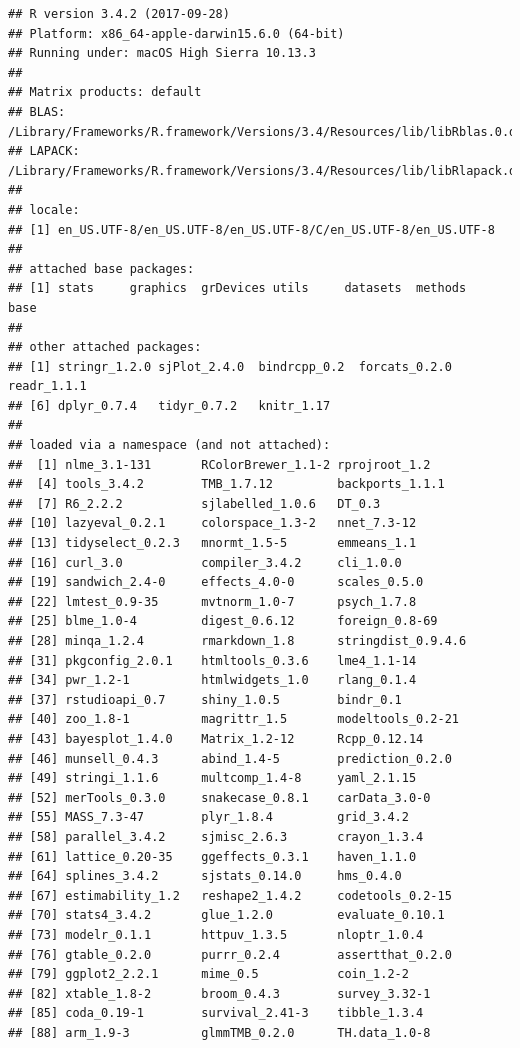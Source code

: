 \documentclass[]{article}
\begin{document}
\begin{verbatim}
## R version 3.4.2 (2017-09-28)
## Platform: x86_64-apple-darwin15.6.0 (64-bit)
## Running under: macOS High Sierra 10.13.3
## 
## Matrix products: default
## BLAS: /Library/Frameworks/R.framework/Versions/3.4/Resources/lib/libRblas.0.dylib
## LAPACK: /Library/Frameworks/R.framework/Versions/3.4/Resources/lib/libRlapack.dylib
## 
## locale:
## [1] en_US.UTF-8/en_US.UTF-8/en_US.UTF-8/C/en_US.UTF-8/en_US.UTF-8
## 
## attached base packages:
## [1] stats     graphics  grDevices utils     datasets  methods   base     
## 
## other attached packages:
## [1] stringr_1.2.0 sjPlot_2.4.0  bindrcpp_0.2  forcats_0.2.0 readr_1.1.1  
## [6] dplyr_0.7.4   tidyr_0.7.2   knitr_1.17   
## 
## loaded via a namespace (and not attached):
##  [1] nlme_3.1-131       RColorBrewer_1.1-2 rprojroot_1.2     
##  [4] tools_3.4.2        TMB_1.7.12         backports_1.1.1   
##  [7] R6_2.2.2           sjlabelled_1.0.6   DT_0.3            
## [10] lazyeval_0.2.1     colorspace_1.3-2   nnet_7.3-12       
## [13] tidyselect_0.2.3   mnormt_1.5-5       emmeans_1.1       
## [16] curl_3.0           compiler_3.4.2     cli_1.0.0         
## [19] sandwich_2.4-0     effects_4.0-0      scales_0.5.0      
## [22] lmtest_0.9-35      mvtnorm_1.0-7      psych_1.7.8       
## [25] blme_1.0-4         digest_0.6.12      foreign_0.8-69    
## [28] minqa_1.2.4        rmarkdown_1.8      stringdist_0.9.4.6
## [31] pkgconfig_2.0.1    htmltools_0.3.6    lme4_1.1-14       
## [34] pwr_1.2-1          htmlwidgets_1.0    rlang_0.1.4       
## [37] rstudioapi_0.7     shiny_1.0.5        bindr_0.1         
## [40] zoo_1.8-1          magrittr_1.5       modeltools_0.2-21 
## [43] bayesplot_1.4.0    Matrix_1.2-12      Rcpp_0.12.14      
## [46] munsell_0.4.3      abind_1.4-5        prediction_0.2.0  
## [49] stringi_1.1.6      multcomp_1.4-8     yaml_2.1.15       
## [52] merTools_0.3.0     snakecase_0.8.1    carData_3.0-0     
## [55] MASS_7.3-47        plyr_1.8.4         grid_3.4.2        
## [58] parallel_3.4.2     sjmisc_2.6.3       crayon_1.3.4      
## [61] lattice_0.20-35    ggeffects_0.3.1    haven_1.1.0       
## [64] splines_3.4.2      sjstats_0.14.0     hms_0.4.0         
## [67] estimability_1.2   reshape2_1.4.2     codetools_0.2-15  
## [70] stats4_3.4.2       glue_1.2.0         evaluate_0.10.1   
## [73] modelr_0.1.1       httpuv_1.3.5       nloptr_1.0.4      
## [76] gtable_0.2.0       purrr_0.2.4        assertthat_0.2.0  
## [79] ggplot2_2.2.1      mime_0.5           coin_1.2-2        
## [82] xtable_1.8-2       broom_0.4.3        survey_3.32-1     
## [85] coda_0.19-1        survival_2.41-3    tibble_1.3.4      
## [88] arm_1.9-3          glmmTMB_0.2.0      TH.data_1.0-8
\end{verbatim}
\end{document}
